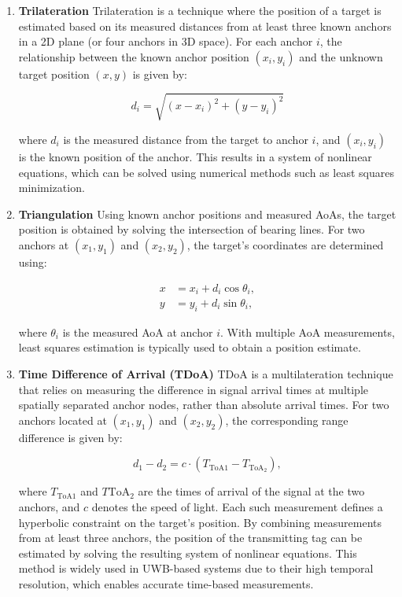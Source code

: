\begin{enumerate}
    \item \textbf{Trilateration}
    Trilateration is a technique where the position of a target is estimated based on its measured distances from at least three known anchors in a 2D plane (or four anchors in 3D space). For each anchor $i$, the relationship between the known anchor position $(x_i, y_i)$ and the unknown target position $(x, y)$ is given by:
    
    \begin{equation}
    d_i = \sqrt{(x - x_i)^2 + (y - y_i)^2}
    \end{equation}
    
    where $d_i$ is the measured distance from the target to anchor $i$, and $(x_i, y_i)$ is the known position of the anchor. This results in a system of nonlinear equations, which can be solved using numerical methods such as least squares minimization.

    \item \textbf{Triangulation}
    Using known anchor positions and measured AoAs, the target position is obtained by solving the intersection of bearing lines. For two anchors at $(x_1, y_1)$ and $(x_2, y_2)$, the target’s coordinates are determined using:
    
    \begin{align}
    x &= x_i + d_i \cos \theta_i, \\
    y &= y_i + d_i \sin \theta_i,
    \end{align}
    
    where $\theta_i$ is the measured AoA at anchor $i$. With multiple AoA measurements, least squares estimation is typically used to obtain a position estimate.

    \item \textbf{Time Difference of Arrival (TDoA)}
    TDoA is a multilateration technique that relies on measuring the difference in signal arrival times at multiple spatially separated anchor nodes, rather than absolute arrival times. For two anchors located at $(x_1, y_1)$ and $(x_2, y_2)$, the corresponding range difference is given by:

    \begin{equation} 
    d_1 - d_2 = c \cdot (T_{\text{ToA}1} - T_{\text{ToA}_2}), 
    \end{equation}
    
    where $T_{\text{ToA}1}$ and $T{\text{ToA}_2}$ are the times of arrival of the signal at the two anchors, and $c$ denotes the speed of light. Each such measurement defines a hyperbolic constraint on the target's position. By combining measurements from at least three anchors, the position of the transmitting tag can be estimated by solving the resulting system of nonlinear equations. This method is widely used in UWB-based systems due to their high temporal resolution, which enables accurate time-based measurements.
\end{enumerate}


